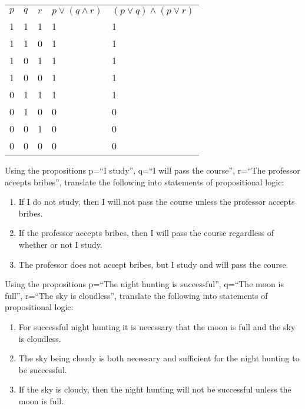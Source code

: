 \documentclass[solution, letterpaper]{cs20inclass}
\begin{document}
\begin{solution}

\begin{table}[h]
\centering
\label{my-label}
\begin{tabular}{lllll}
$p$ & $q$ & $r$ & $p \lor (q \land r)$ & $(p \lor q) \land (p \lor r)$ \\
1 & 1 & 1 & 1                    & 1                           \\
1 & 1 & 0 & 1                    & 1                           \\
1 & 0 & 1 & 1                    & 1                           \\
1 & 0 & 0 & 1                    & 1                           \\
0 & 1 & 1 & 1                    & 1                           \\
0 & 1 & 0 & 0                    & 0                           \\
0 & 0 & 1 & 0                    & 0                           \\
0 & 0 & 0 & 0                    & 0                          
\end{tabular}
\end{table}

\end{solution}

\problem

\subproblem	
Using the propositions p=``I study'', q=``I will pass the course'', r=``The professor accepts bribes'',  translate the following into statements of propositional logic: 
	\begin{enumerate}
	\item If I do not study, then I will not pass the course unless the professor accepts bribes.
	\item If the professor accepts bribes, then I will pass the course regardless of whether or not I study.
	\item The professor does not accept bribes, but I study and will pass the course.
	\end{enumerate}
	
	
\subproblem Using the propositions p=``The night hunting is successful'', q=``The moon is full'', r=``The sky is cloudless'', translate the following into statements of propositional logic: 
	
	\begin{enumerate}
	\item For successful night hunting it is necessary that the moon is full and the sky is cloudless.
	\item The sky being cloudy is both necessary and sufficient for the night hunting to be successful.
	\item  If the sky is cloudy, then the night hunting will not be successful unless the moon is full.
	\end{enumerate}
\end{document}
